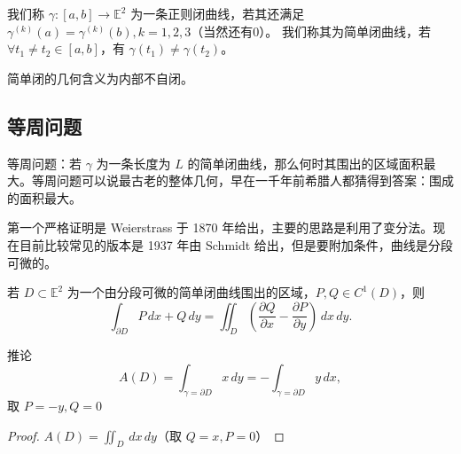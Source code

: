 \documentclass[lang=cn,10pt,thmcnt=section]{elegantbook}
\begin{document}
    \begin{definition}\label{def:closed_curve}
    我们称 $\gamma : [a, b] \rightarrow \mathbb{E}^2$ 为一条正则闭曲线，若其还满足 $\gamma^{(k)}(a) = \gamma^{(k)}(b), k = 1, 2, 3$（当然还有0）。
    我们称其为简单闭曲线，若 $\forall t_1 \neq t_2 \in [a, b]$，有 $\gamma(t_1) \neq \gamma(t_2)$。
    \begin{remark}
        简单闭的几何含义为内部不自闭。
    \end{remark}
   
\end{definition}
\subsection{等周问题}
等周问题：若 $\gamma$ 为一条长度为 $L$ 的简单闭曲线，那么何时其围出的区域面积最大。等周问题可以说最古老的整体几何，早在一千年前希腊人都猜得到答案：围成的面积最大。

第一个严格证明是 Weierstrass 于 1870 年给出，主要的思路是利用了变分法。现在目前比较常见的版本是 1937 年由 Schmidt 给出，但是要附加条件，曲线是分段可微的。

\begin{theorem}[Green 定理]\label{thm:green}
     若 $D \subset \mathbb{E}^2$ 为一个由分段可微的简单闭曲线围出的区域，$P, Q \in C^1(D)$，则
    \[
    \int_{\partial D} P \, dx + Q \, dy = \iint_D \left( \frac{\partial Q}{\partial x} - \frac{\partial P}{\partial y} \right) \, dx \, dy.
    \]
    \end{theorem}
    
    推论
    \[
    A(D) = \int_{\gamma = \partial D} x \, dy = -\int_{\gamma = \partial D} y \, dx,
    \]
    取 $P = -y, Q = 0$
    \begin{proof}
        $A(D) = \iint_D \, dx \, dy$（取 $Q = x, P = 0$）
    \end{proof}
    
\end{document}
